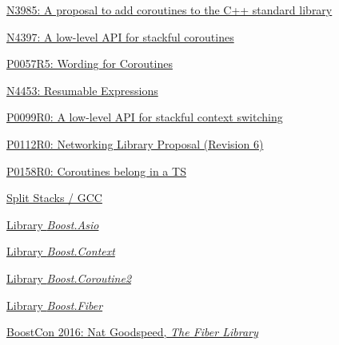 \begin{thebibliography}{99}

        \href{http://www.open-std.org/jtc1/sc22/wg21/docs/papers/2014/n3985.pdf}
        {N3985: A proposal to add coroutines to the C++ standard library}

        \href{http://www.open-std.org/jtc1/sc22/wg21/docs/papers/2015/n4397.pdf}
        {N4397: A low-level API for stackful coroutines}

        \href{http://www.open-std.org/jtc1/sc22/wg21/docs/papers/2016/p0057r5.pdf}
        {P0057R5: Wording for Coroutines}

        \href{http://www.open-std.org/jtc1/sc22/wg21/docs/papers/2015/n4453.pdf}
        {N4453: Resumable Expressions}

        \href{http://www.open-std.org/jtc1/sc22/wg21/docs/papers/2015/p0099r0.pdf}
        {P0099R0: A low-level API for stackful context switching}

        \href{http://www.open-std.org/jtc1/sc22/wg21/docs/papers/2015/p0112r0.html}
        {P0112R0: Networking Library Proposal (Revision 6)}

        \href{http://www.open-std.org/jtc1/sc22/wg21/docs/papers/2015/p0158r0.html}
        {P0158R0: Coroutines belong in a TS}

        \href{http://gcc.gnu.org/wiki/SplitStacks}
        {Split Stacks / GCC}

        \href{http://www.boost.org/doc/libs/release/doc/html/boost\_asio.html}
        {Library \emph{Boost.Asio}}

        \href{http://www.boost.org/doc/libs/release/libs/context/doc/html/index.html}
        {Library \emph{Boost.Context}}

        \href{http://www.boost.org/doc/libs/release/libs/coroutine2/doc/html/index.html}
        {Library \emph{Boost.Coroutine2}}

        \href{http://www.boost.org/doc/libs/release/libs/fiber/doc/html/index.html}
        {Library \emph{Boost.Fiber}}

        \href{https://www.youtube.com/watch?v=gcNphOWuUb0}
        {BoostCon 2016: Nat Goodspeed, \emph{The Fiber Library}}

\end{thebibliography}
